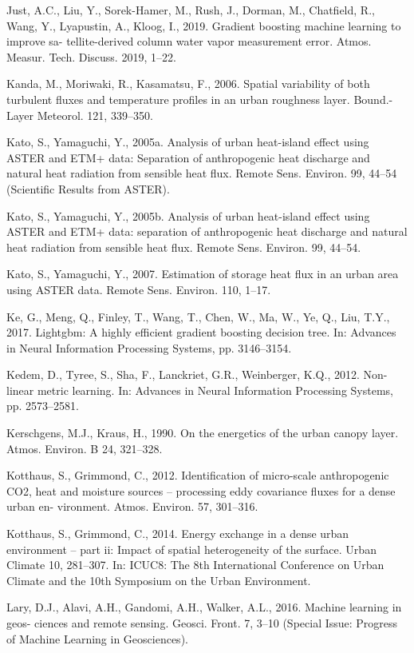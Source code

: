 \documentclass[3p,times]{elsarticle}
\begin{document}
Just, A.C., Liu, Y., Sorek-Hamer, M., Rush, J., Dorman, M., Chatfield, R., Wang, Y., Lyapustin, A., Kloog, I., 2019. Gradient boosting machine learning to improve sa- tellite-derived column water vapor measurement error. Atmos. Measur. Tech. Discuss. 2019, 1–22.

Kanda, M., Moriwaki, R., Kasamatsu, F., 2006. Spatial variability of both turbulent fluxes and temperature profiles in an urban roughness layer. Bound.-Layer Meteorol. 121, 339–350.

Kato, S., Yamaguchi, Y., 2005a. Analysis of urban heat-island effect using ASTER and ETM+ data: Separation of anthropogenic heat discharge and natural heat radiation from sensible heat flux. Remote Sens. Environ. 99, 44–54 (Scientific Results from ASTER).

Kato, S., Yamaguchi, Y., 2005b. Analysis of urban heat-island effect using ASTER and ETM+ data: separation of anthropogenic heat discharge and natural heat radiation from sensible heat flux. Remote Sens. Environ. 99, 44–54.

Kato, S., Yamaguchi, Y., 2007. Estimation of storage heat flux in an urban area using ASTER data. Remote Sens. Environ. 110, 1–17.

Ke, G., Meng, Q., Finley, T., Wang, T., Chen, W., Ma, W., Ye, Q., Liu, T.Y., 2017. Lightgbm: A highly efficient gradient boosting decision tree. In: Advances in Neural Information Processing Systems, pp. 3146–3154.

Kedem, D., Tyree, S., Sha, F., Lanckriet, G.R., Weinberger, K.Q., 2012. Non-linear metric learning. In: Advances in Neural Information Processing Systems, pp. 2573–2581.

Kerschgens, M.J., Kraus, H., 1990. On the energetics of the urban canopy layer. Atmos. Environ. B 24, 321–328.

Kotthaus, S., Grimmond, C., 2012. Identification of micro-scale anthropogenic CO2, heat and moisture sources – processing eddy covariance fluxes for a dense urban en- vironment. Atmos. Environ. 57, 301–316.

Kotthaus, S., Grimmond, C., 2014. Energy exchange in a dense urban environment – part ii: Impact of spatial heterogeneity of the surface. Urban Climate 10, 281–307. In: ICUC8: The 8th International Conference on Urban Climate and the 10th Symposium on the Urban Environment.

Lary, D.J., Alavi, A.H., Gandomi, A.H., Walker, A.L., 2016. Machine learning in geos- ciences and remote sensing. Geosci. Front. 7, 3–10 (Special Issue: Progress of Machine Learning in Geosciences).
\end{document}
